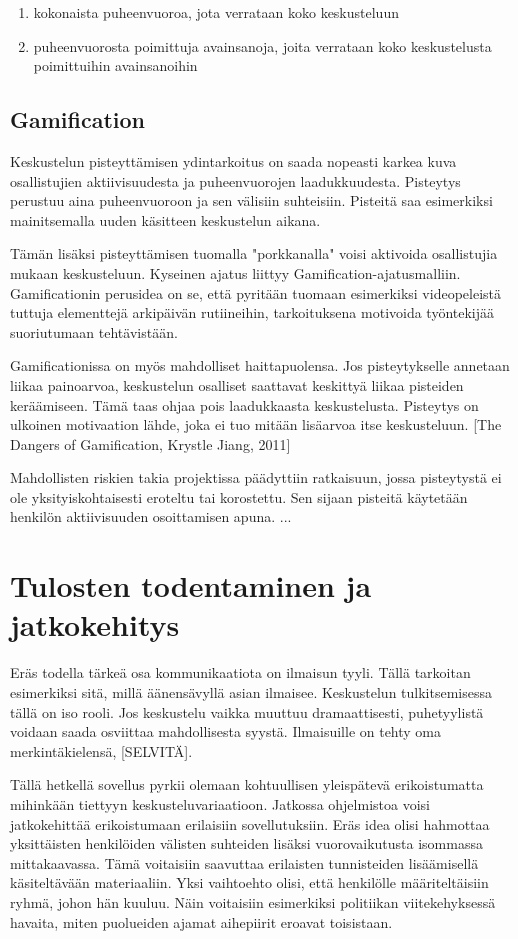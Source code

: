 \documentclass[11pt,a4paper,oneside]{memoir}
\begin{document}
\begin{enumerate}
\item kokonaista puheenvuoroa, jota verrataan koko keskusteluun
\item puheenvuorosta poimittuja avainsanoja, joita verrataan koko keskustelusta poimittuihin avainsanoihin
\end{enumerate}

\section{Gamification}
Keskustelun pisteyttämisen ydintarkoitus on saada nopeasti karkea kuva osallistujien aktiivisuudesta ja puheenvuorojen laadukkuudesta. Pisteytys perustuu aina puheenvuoroon ja sen välisiin suhteisiin. Pisteitä saa esimerkiksi mainitsemalla uuden käsitteen keskustelun aikana.

Tämän lisäksi pisteyttämisen tuomalla "porkkanalla" voisi aktivoida osallistujia mukaan keskusteluun. Kyseinen ajatus liittyy Gamification-ajatusmalliin. Gamificationin perusidea on se, että pyritään tuomaan esimerkiksi videopeleistä tuttuja elementtejä arkipäivän rutiineihin, tarkoituksena motivoida työntekijää suoriutumaan tehtävistään.

Gamificationissa on myös mahdolliset haittapuolensa. Jos pisteytykselle annetaan liikaa painoarvoa, keskustelun osalliset saattavat keskittyä liikaa pisteiden keräämiseen. Tämä taas ohjaa pois laadukkaasta keskustelusta. Pisteytys on ulkoinen motivaation lähde, joka ei tuo mitään lisäarvoa itse keskusteluun. [The Dangers of Gamification, Krystle Jiang, 2011]

Mahdollisten riskien takia projektissa päädyttiin ratkaisuun, jossa pisteytystä ei ole yksityiskohtaisesti eroteltu tai korostettu. Sen sijaan pisteitä käytetään henkilön aktiivisuuden osoittamisen apuna.
...

\chapter{Tulosten todentaminen ja jatkokehitys}
Eräs todella tärkeä osa kommunikaatiota on ilmaisun tyyli. Tällä tarkoitan esimerkiksi sitä, millä äänensävyllä asian ilmaisee. Keskustelun tulkitsemisessa tällä on iso rooli. Jos keskustelu vaikka muuttuu dramaattisesti, puhetyylistä voidaan saada osviittaa mahdollisesta syystä. Ilmaisuille on tehty oma merkintäkielensä, [SELVITÄ].

Tällä hetkellä sovellus pyrkii olemaan kohtuullisen yleispätevä erikoistumatta mihinkään tiettyyn keskusteluvariaatioon. Jatkossa ohjelmistoa voisi jatkokehittää erikoistumaan erilaisiin sovellutuksiin. Eräs idea olisi hahmottaa yksittäisten henkilöiden välisten suhteiden lisäksi vuorovaikutusta isommassa mittakaavassa. Tämä voitaisiin saavuttaa erilaisten tunnisteiden lisäämisellä käsiteltävään materiaaliin. Yksi vaihtoehto olisi, että henkilölle määriteltäisiin ryhmä, johon hän kuuluu. Näin voitaisiin esimerkiksi politiikan viitekehyksessä havaita, miten puolueiden ajamat aihepiirit eroavat toisistaan.
\end{document}
